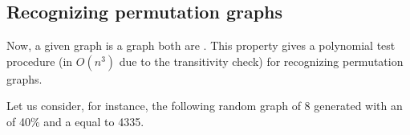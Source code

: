 \documentclass[a4paper,12pt,english]{sphinxhowto}
\begin{document}
\begin{sphinxVerbatim}[commandchars=\\\{\},numbers=left,firstnumber=1,stepnumber=1]
  
 \PYGZbs{}
             
\end{sphinxVerbatim}


\subsection{Recognizing permutation graphs}
\label{\detokenize{tutorial:recognizing-permutation-graphs}}
Now, a given graph  is a  graph  both    are . This  property gives a polynomial test procedure (in \(O(n^3)\) due to the transitivity check) for recognizing permutation graphs.

Let us consider, for instance, the following random graph of  8 generated with an  of 40\% and a  equal to 4335.
\end{document}

